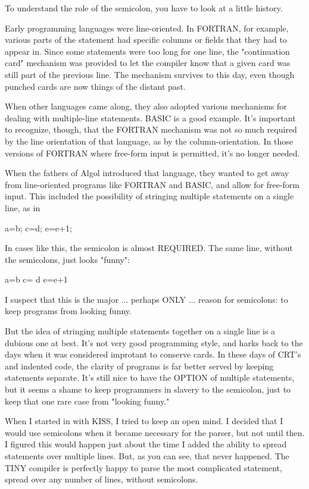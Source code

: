 \documentclass[float=false, crop=false]{standalone}
\begin{document}
To understand the role of the semicolon, you have to look at a little history.

Early programming languages were line-oriented. In FORTRAN, for example, various
parts of the statement had specific columns or fields that they had to appear
in. Since some statements were too long for one line, the "continuation card"
mechanism was provided to let the compiler know that a given card was still part
of the previous line. The mechanism survives to this day, even though punched
cards are now things of the distant past.

When other languages came along, they also adopted various mechanisms for
dealing with multiple-line statements. BASIC is a good example. It's important
to recognize, though, that the FORTRAN mechanism was not so much required by the
line orientation of that language, as by the column-orientation. In those
versions of FORTRAN where free-form input is permitted, it's no longer needed.

When the fathers of Algol introduced that language, they wanted to get away from
line-oriented programs like FORTRAN and BASIC, and allow for free-form input.
This included the possibility of stringing multiple statements on a single line,
as in


     a=b; c=d; e=e+1;


In cases like this, the semicolon is almost REQUIRED. The same line, without the
semicolons, just looks "funny":


     a=b c= d e=e+1

I suspect that this is the major ... perhaps ONLY ... reason for semicolons: to
keep programs from looking funny.

But the idea of stringing multiple statements together on a single line is a
dubious one at best. It's not very good programming style, and harks back to the
days when it was considered improtant to conserve cards. In these days of CRT's
and indented code, the clarity of programs is far better served by keeping
statements separate. It's still nice to have the OPTION of multiple statements,
but it seems a shame to keep programmers in slavery to the semicolon, just to
keep that one rare case from "looking funny."

When I started in with KISS, I tried to keep an open mind. I decided that I
would use semicolons when it became necessary for the parser, but not until
then. I figured this would happen just about the time I added the ability to
spread statements over multiple lines. But, as you can see, that never happened.
The TINY compiler is perfectly happy to parse the most complicated statement,
spread over any number of lines, without semicolons.
\end{document}
